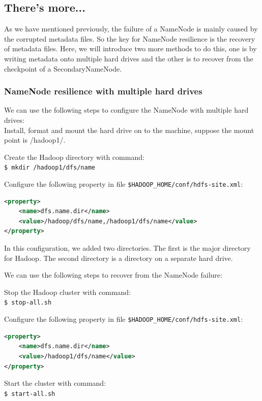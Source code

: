 \subsection*{There's more...}
As we have mentioned previously, the failure of a NameNode is mainly caused by the corrupted metadata files. So the key for NameNode resilience is the recovery of metadata files. Here, we will introduce two more methods to do this, one is by writing metadata onto multiple hard drives and the other is to recover from the checkpoint of a SecondaryNameNode.

\subsubsection*{NameNode resilience with multiple hard drives}
We can use the following steps to configure the NameNode with multiple hard drives:\\

Install, format and mount the hard drive on to the machine, suppose the mount point is /hadoop1/.

Create the Hadoop directory with command: \\
\verb|$ mkdir /hadoop1/dfs/name|

Configure the following property in file \verb|$HADOOP_HOME/conf/hdfs-site.xml|:
\lstset{style=bashstyle}
\begin{lstlisting}[language=XML]
<property>
    <name>dfs.name.dir</name>
    <value>/hadoop/dfs/name,/hadoop1/dfs/name</value>
</property>
\end{lstlisting}

In this configuration, we added two directories. The first is the major directory for Hadoop. The second directory is a directory on a separate hard drive.

We can use the following steps to recover from the NameNode failure:

Stop the Hadoop cluster with command: \\
\verb|$ stop-all.sh|

Configure the following property in file \verb|$HADOOP_HOME/conf/hdfs-site.xml|:
\lstset{style=bashstyle}
\begin{lstlisting}[language=XML]
<property>
    <name>dfs.name.dir</name>
    <value>/hadoop1/dfs/name</value>
</property>
\end{lstlisting}

Start the cluster with command: \\
\verb|$ start-all.sh|

